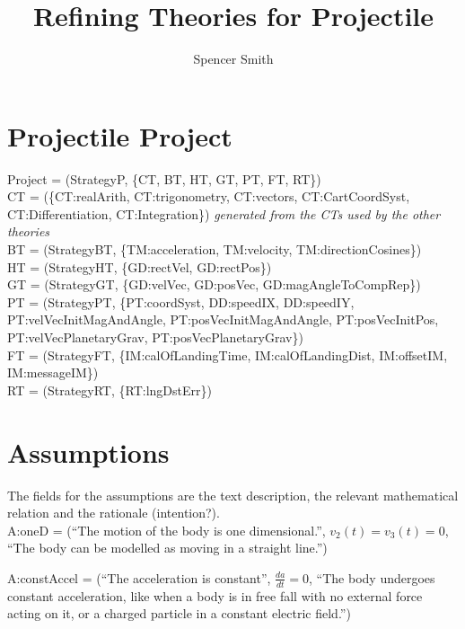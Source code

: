 \documentclass{article}
\title{Refining Theories for Projectile}
\author{Spencer Smith}
\begin{document}
\maketitle

\section{Projectile Project}

\noindent Project = (StrategyP, \{CT, BT, HT, GT, PT, FT, RT\})\\

\noindent CT = (\{CT:realArith, CT:trigonometry, CT:vectors, CT:CartCoordSyst,
CT:Differentiation, CT:Integration\}) \textit{generated from the CTs used by the other
theories}\\

\noindent BT = (StrategyBT, \{TM:acceleration, TM:velocity,
TM:directionCosines\})\\

\noindent HT = (StrategyHT, \{GD:rectVel, GD:rectPos\})\\

\noindent GT = (StrategyGT, \{GD:velVec, GD:posVec, GD:magAngleToCompRep\})\\

\noindent PT = (StrategyPT, \{PT:coordSyst, DD:speedIX, DD:speedIY,
PT:velVecInitMagAndAngle, PT:posVecInitMagAndAngle, PT:posVecInitPos,
PT:velVecPlanetaryGrav, PT:posVecPlanetaryGrav\})\\

\noindent FT = (StrategyFT, \{IM:calOfLandingTime, IM:calOfLandingDist,
IM:offsetIM, IM:messageIM\})\\

\noindent RT = (StrategyRT, \{RT:lngDstErr\})\\

\section{Assumptions}

The fields for the assumptions are the text description, the relevant
mathematical relation and the rationale (intention?).\\

\noindent A:oneD = (``The motion of the body is one dimensional.'', $v_2(t) =
v_3(t) = 0$, ``The body can be modelled as moving in a straight line.'')

\noindent A:constAccel = (``The acceleration is constant'', $\frac{d a}{dt} =
0$, ``The body undergoes constant acceleration, like when a body is in free fall
with no external force acting on it, or a charged particle in a constant
electric field.'')
\end{document}
